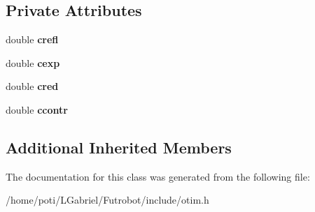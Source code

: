 \subsection*{Private Attributes}
\begin{DoxyCompactItemize}
\item 
double {\bfseries crefl}\hypertarget{classpoliedro_a1948f331a859197f33adfa8bc5fbcde4}{}\label{classpoliedro_a1948f331a859197f33adfa8bc5fbcde4}

\item 
double {\bfseries cexp}\hypertarget{classpoliedro_a7e4680278f6b68688d195347acfe645c}{}\label{classpoliedro_a7e4680278f6b68688d195347acfe645c}

\item 
double {\bfseries cred}\hypertarget{classpoliedro_a48f98c367200b5e610beca7175a29fab}{}\label{classpoliedro_a48f98c367200b5e610beca7175a29fab}

\item 
double {\bfseries ccontr}\hypertarget{classpoliedro_ad0a71c89a997c19b1a8ffee2228a919e}{}\label{classpoliedro_ad0a71c89a997c19b1a8ffee2228a919e}

\end{DoxyCompactItemize}
\subsection*{Additional Inherited Members}


The documentation for this class was generated from the following file\+:\begin{DoxyCompactItemize}
\item 
/home/poti/\+L\+Gabriel/\+Futrobot/include/otim.\+h\end{DoxyCompactItemize}
